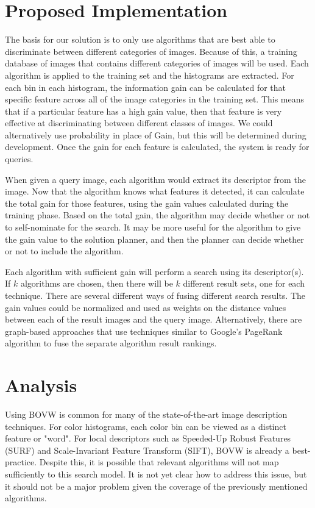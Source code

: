 \documentclass[12pt]{article}
\begin{document}
\section{Proposed Implementation}
The basis for our solution is to only use algorithms that are best able to discriminate between different categories of images. Because of this, a training database of images that contains different categories of images will be used. Each algorithm is applied to the training set and the histograms are extracted. For each bin in each histogram, the information gain can be calculated for that specific feature across all of the image categories in the training set. This means that if a particular feature has a high gain value, then that feature is very effective at discriminating between different classes of images. We could alternatively use probability in place of Gain, but this will be determined during development. Once the gain for each feature is calculated, the system is ready for queries.

When given a query image, each algorithm would extract its descriptor from the image. Now that the algorithm knows what features it detected, it can calculate the total gain for those features, using the gain values calculated during the training phase. Based on the total gain, the algorithm may decide whether or not to self-nominate for the search. It may be more useful for the algorithm to give the gain value to the solution planner, and then the planner can decide whether or not to include the algorithm.

Each algorithm with sufficient gain will perform a search using its descriptor(s). If $k$ algorithms are chosen, then there will be $k$ different result sets, one for each technique. There are several different ways of fusing different search results. The gain values could be normalized and used as weights on the distance values between each of the result images and the query image. Alternatively, there are graph-based approaches that use techniques similar to Google's PageRank algorithm to fuse the separate algorithm result rankings.

\section{Analysis}
Using BOVW is common for many of the state-of-the-art image description techniques.\cite{Bay2008} For color histograms, each color bin can be viewed as a distinct feature or "word". For local descriptors such as Speeded-Up Robust Features (SURF) and Scale-Invariant Feature Transform (SIFT), BOVW is already a best-practice. Despite this, it is possible that relevant algorithms will not map sufficiently to this search model. It is not yet clear how to address this issue, but it should not be a major problem given the coverage of the previously mentioned algorithms.
\end{document}

